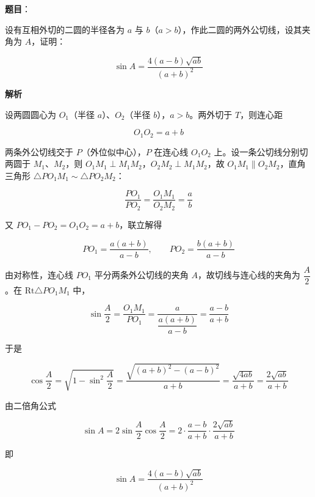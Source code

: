 \begin{answer}

\textbf{题目}：

设有互相外切的二圆的半径各为 $a$ 与 $b$（$a>b$），作此二圆的两外公切线，设其夹角为 $A$，证明：

\nopagebreak[4]
\[
\sin A=\frac{4(a-b)\sqrt{ab}}{(a+b)^2}
\]

\textbf{解析}

设两圆圆心为 $O_1$（半径 $a$）、$O_2$（半径 $b$），$a>b$。两外切于 $T$，则连心距

\nopagebreak[4]
\[
O_1O_2=a+b
\]

两条外公切线交于 $P$（外位似中心），$P$ 在连心线 $O_1O_2$ 上。设一条公切线分别切两圆于 $M_1$、$M_2$，则 $O_1M_1\perp M_1M_2$，$O_2M_2\perp M_1M_2$，故 $O_1M_1\parallel O_2M_2$，直角三角形 $\triangle PO_1M_1\sim\triangle PO_2M_2$：

\nopagebreak[4]
\[
\frac{PO_1}{PO_2}=\frac{O_1M_1}{O_2M_2}=\frac ab
\]

又 $PO_1-PO_2=O_1O_2=a+b$，联立解得

\nopagebreak[4]
\[
PO_1=\frac{a(a+b)}{a-b},\qquad PO_2=\frac{b(a+b)}{a-b}
\]

由对称性，连心线 $PO_1$ 平分两条外公切线的夹角 $A$，故切线与连心线的夹角为 $\dfrac A2$。在 $\mathrm{Rt}\triangle PO_1M_1$ 中，

\nopagebreak[4]
\[
\sin\frac A2=\frac{O_1M_1}{PO_1}=\frac{a}{\dfrac{a(a+b)}{a-b}}=\frac{a-b}{a+b}
\]

于是

\nopagebreak[4]
\[
\cos\frac A2=\sqrt{1-\sin^2\frac A2}=\frac{\sqrt{(a+b)^2-(a-b)^2}}{a+b}=\frac{\sqrt{4ab}}{a+b}=\frac{2\sqrt{ab}}{a+b}
\]

由二倍角公式

\nopagebreak[4]
\[
\sin A=2\sin\frac A2\cos\frac A2=2\cdot\frac{a-b}{a+b}\cdot\frac{2\sqrt{ab}}{a+b}
\]

即

\nopagebreak[4]
\[
\sin A=\frac{4(a-b)\sqrt{ab}}{(a+b)^2}
\]


\end{answer}
